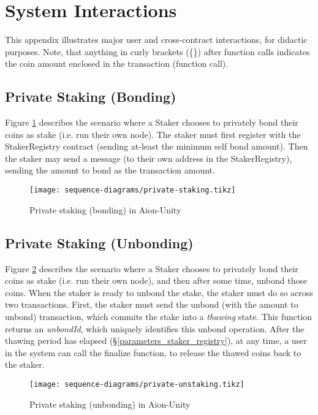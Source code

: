 \section{System Interactions}

This appendix illustrates major user and cross-contract interactions, for didactic purposes. Note, that anything in curly brackets (\{\}) after function calls indicates the coin amount enclosed in the transaction (function call).

\label{appendix:sequence_diagrams}

\subsection{Private Staking (Bonding)}
Figure \ref{fig:priv_staking} describes the scenario where a Staker chooses to privately bond their coins as stake (i.e. run their own node). The staker must first register with the StakerRegistry contract (sending at-least the minimum self bond amount). Then the staker may send a  message (to their own address in the StakerRegistry), sending the amount to bond as the transaction amount. 

\begin{figure}[ht]
\centering
\texttt{[image: sequence-diagrams/private-staking.tikz]}
\caption{Private staking (bonding) in Aion-Unity}
\label{fig:priv_staking}
\end{figure}
\clearpage

\subsection{Private Staking (Unbonding)}
Figure \ref{fig:priv_unstaking} describes the scenario where a Staker chooses to privately bond their coins as stake (i.e. run their own node), and then after some time, unbond those coins. When the staker is ready to unbond the stake, the staker must do so across two transactions. First, the staker must send the unbond (with the amount to unbond) transaction, which commits the stake into a \textit{thawing} state. This function returns an \textit{unbondId}, which uniquely identifies this unbond operation. After the thawing period has elapsed (\S\ref{parameters_staker_registry}), at any time, a user in the system can call the finalize function, to release the thawed coins back to the staker. 

\begin{figure}[ht]
\centering
\texttt{[image: sequence-diagrams/private-unstaking.tikz]}
\caption{Private staking (unbonding) in Aion-Unity}
\label{fig:priv_unstaking}
\end{figure}
\clearpage



